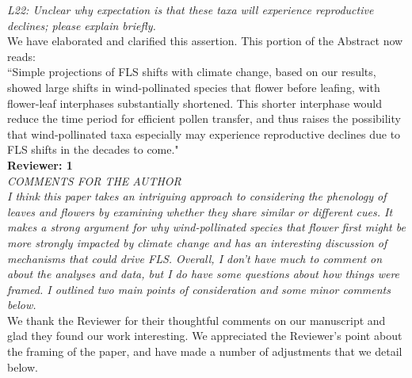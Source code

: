 \documentclass[11pt]{article}
\begin{document}
\emph{L22: Unclear why expectation is that these taxa will experience reproductive declines; please explain briefly.}\\
 
\noindent We have elaborated and clarified this assertion. This portion of the Abstract now reads:\\
 
 ``Simple projections of FLS shifts with climate change, based on our results, showed large shifts in wind-pollinated species that flower before leafing, with flower-leaf interphases substantially shortened. This shorter interphase would reduce the time period for efficient
pollen transfer, and thus raises the possibility that wind-pollinated taxa especially may experience reproductive declines due to FLS shifts in the decades to come."\\

\textbf{Reviewer: 1}\\

\emph{COMMENTS FOR THE AUTHOR\\
I think this paper takes an intriguing approach to considering the phenology of leaves and flowers by examining whether they share similar or different cues. It makes a strong argument for why wind-pollinated species that flower first might be more strongly impacted by climate change and has an interesting discussion of mechanisms that could drive FLS. Overall, I don’t have much to comment on about the analyses and data, but I do have some questions about how things were framed. I outlined two main points of consideration and some minor comments below.}\\

\noindent We thank the Reviewer for their thoughtful comments on our manuscript and glad they found our work interesting. We appreciated the Reviewer's point about the framing of the paper, and have made a number of adjustments that we detail below. \\
\end{document}
